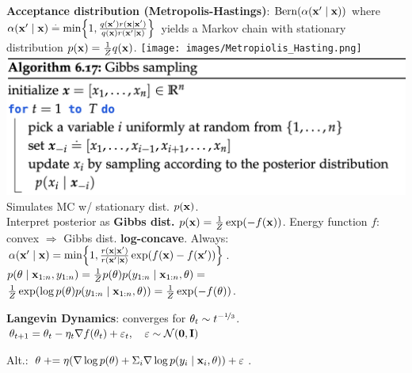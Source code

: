\textbf{Acceptance distribution (Metropolis-Hastings)}: $\Bern{\alpha(\vxp \mid \vx)}$ where $\alpha(\vxp \mid \vx) \defeq \min \braces*{1, \frac{q(\vxp) r(\vx \mid \vxp)}{q(\vx) r(\vxp \mid \vx)}}$ yields a Markov chain with stationary distribution $p(\mathbf{x}) = \frac{1}{Z} q(\mathbf{x})$.
\texttt{[image: images/Metropiolis\_Hasting.png]}
\vspace{-2mm}
\includegraphics[width=0.95\linewidth]{images/Gibbs_Sampling.png} 
Simulates MC w/ stationary dist. $p(\mathbf{x})$. \\
Interpret posterior as \textbf{Gibbs dist.} $p(\mathbf{x}) = \frac{1}{Z} \exp(- f(\mathbf{x}))$. Energy function $f$: convex $\Rightarrow$ Gibbs dist. \textbf{log-concave}. Always: $\alpha(\vxp \mid \vx) = \min \braces*{1, \frac{r(\vx \mid \vxp)}{r(\vxp \mid \vx)} \exp(f(\vx) - f(\vxp))}$. \\
$p(\mathbf{\theta} \mid \mathbf{x}_{1:n}, y_{1:n}) = \frac{1}{Z} p(\mathbf{\theta}) p(y_{1:n} \mid \mathbf{x}_{1:n}, \mathbf{\theta}) = $\\
$ \frac{1}{Z} \exp(\log p(\mathbf{\theta}) p(y_{1:n} \mid \mathbf{x}_{1:n}, \mathbf{\theta})) = \frac{1}{Z} \exp(-f(\mathbf{\theta}))$.
\begin{framed}
    \textbf{Langevin Dynamics}: converges for $\mathbf{\theta}_t \sim t^{-\nicefrac{1}{3}}$. \\
    $\vtheta_{t+1} = \vtheta_t - \eta_t \nabla f(\vtheta_t) + \varepsilon_t, \quad \varepsilon \sim \N{\vzero}{\mI}$ \\
\end{framed}
Alt.: $\mathbf{\theta} \mathrel{+}= \eta (\nabla \log p(\mathbf{\theta}) + \Sigma_i \nabla \log p(y_i \mid \mathbf{x}_i, \mathbf{\theta})) + \varepsilon$.